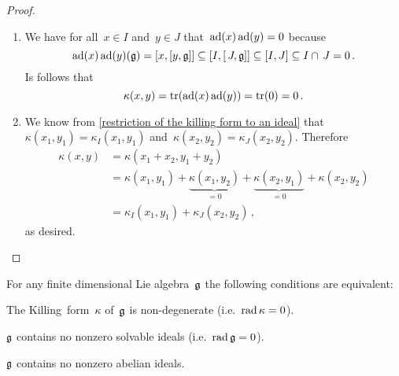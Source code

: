 \begin{proof}
  \leavevmode
  \begin{enumerate}
    \item
      We have for all~$x \in I$ and~$y \in J$ that~$\operatorname{ad}(x) \operatorname{ad}(y) = 0$ because
      \[
        \operatorname{ad}(x)\operatorname{ad}(y)(\mathfrak{g})
        =
        [x,[y,\mathfrak{g}]]
        \subseteq
        [I,[\, J,\mathfrak{g}]]
        \subseteq
        [I,J]
        \subseteq
        I \cap \, J
        =
        0 \,.
      \]
      Is follows that
      \[
        \kappa(x,y)
        =
        \operatorname{tr}(\operatorname{ad}(x)\operatorname{ad}(y))
        =
        \operatorname{tr}(0)
        =
        0 \,.
      \]
    \item
      We know from \cref{restriction of the killing form to an ideal} that~$\kappa(x_1, y_1) = \kappa_I(x_1, y_1)$ and~$\kappa(x_2, y_2) = \kappa_J(x_2, y_2)$.
      Therefore
      \begin{align*}
        \kappa(x,y)
        &=
        \kappa(x_1 + x_2, y_1 + y_2)
        \\
        &=
          \kappa(x_1, y_1)
        + \underbrace{\kappa(x_1, y_2)}_{=0}
        + \underbrace{\kappa(x_2, y_1)}_{=0}
        + \kappa(x_2, y_2)
        \\
        &=
        \kappa_I(x_1, y_1) + \kappa_J(x_2, y_2) \,,
      \end{align*}
      as desired.
    \qedhere
  \end{enumerate}
\end{proof}


\begin{proposition}
  \label{characterisation of zero radical}
  For any finite dimensional Lie algebra~$\mathfrak{g}$ the following conditions are equivalent:
  \begin{equivalenceslist}
    \item
      \label{killing form is nondegenerate}
      The Killing~form~$\kappa$ of~$\mathfrak{g}$ is non-degenerate (i.e.~$\operatorname{rad} \kappa = 0$).
    \item
      \label{contains no solvable ideal}
      $\mathfrak{g}$ contains no nonzero solvable ideals (i.e.~$\operatorname{rad} \mathfrak{g} = 0$).
    \item
      \label{contains no abelian ideal}
      $\mathfrak{g}$ contains no nonzero abelian ideals.
  \end{equivalenceslist}
\end{proposition}


